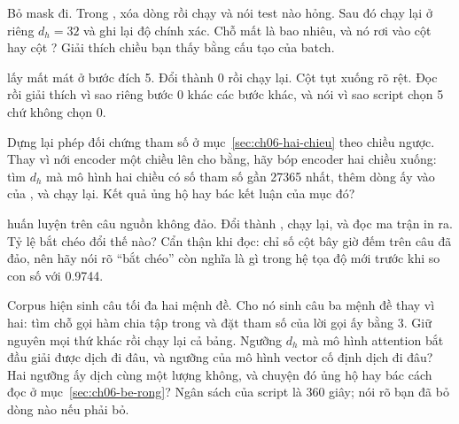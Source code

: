 \begin{bt}
  \item Bỏ mask đi. Trong , xóa dòng
     rồi chạy 
    và nói test nào hỏng. Sau đó chạy lại  ở riêng
    \(d_h = 32\) và ghi lại độ chính xác. Chỗ mất là bao nhiêu, và nó rơi vào
    cột  hay cột ? Giải thích chiều bạn thấy bằng cấu
    tạo của batch.

  \item {} lấy mất mát ở bước đích 5.
    Đổi  thành 0 rồi chạy lại. Cột  tụt
    xuống rõ rệt. Đọc  rồi giải thích vì sao
    riêng bước 0 khác các bước khác, và nói vì sao script chọn 5 chứ không
    chọn 0.

  \item Dựng lại phép đối chứng tham số ở mục~\ref{sec:ch06-hai-chieu} theo
    chiều ngược. Thay vì nới encoder một chiều lên cho bằng, hãy bóp encoder
    hai chiều xuống: tìm \(d_h\) mà mô hình hai chiều có số tham số gần 27365
    nhất, thêm dòng ấy vào  của , và chạy
    lại. Kết quả ủng hộ hay bác kết luận của mục đó?

  \item {} huấn luyện trên câu nguồn không đảo. Đổi
     thành , chạy lại, và đọc ma trận in ra.
    Tỷ lệ bắt chéo đổi thế nào? Cẩn thận khi đọc: chỉ số cột bây giờ đếm trên
    câu đã đảo, nên hãy nói rõ \enquote{bắt chéo} còn nghĩa là gì trong hệ tọa
    độ mới trước khi so con số với 0.9744.

  \item Corpus hiện sinh câu tối đa hai mệnh đề. Cho nó sinh câu ba mệnh đề
    thay vì hai: tìm chỗ gọi hàm chia tập trong  và đặt
    tham số  của lời gọi ấy bằng 3. Giữ nguyên mọi thứ khác
    rồi chạy lại cả bảng. Ngưỡng \(d_h\) mà mô hình attention bắt đầu giải được
    dịch đi đâu, và ngưỡng của mô hình vector cố định dịch đi đâu? Hai ngưỡng
    ấy dịch cùng một lượng không, và chuyện đó ủng hộ hay bác cách đọc ở
    mục~\ref{sec:ch06-be-rong}? Ngân sách của script là 360 giây; nói rõ bạn
    đã bỏ dòng nào nếu phải bỏ.
\end{bt}

\tierextend

